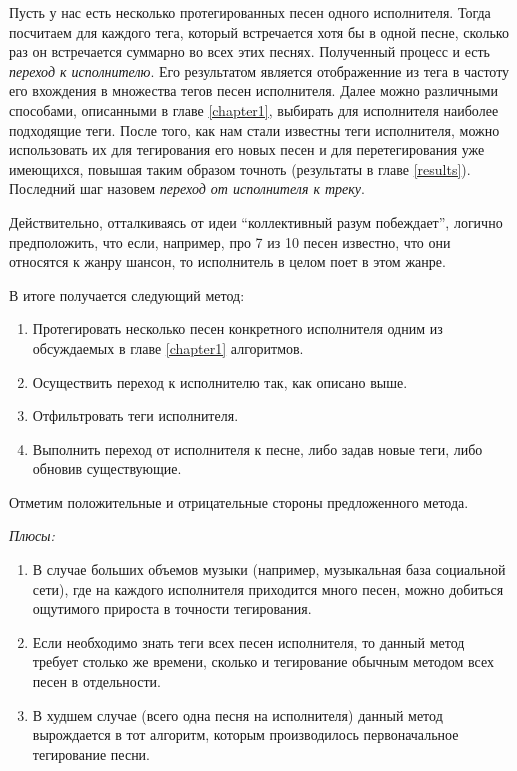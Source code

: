 Пусть у нас есть несколько протегированных песен одного исполнителя. Тогда посчитаем для каждого тега, который встречается хотя бы в одной песне, сколько раз он встречается суммарно во всех этих песнях.
Полученный процесс и есть \emph{переход к исполнителю}. Его результатом является отображенние из тега в частоту его вхождения в множества тегов песен исполнителя. 
Далее можно различными способами, описанными в главе \ref{chapter1}, выбирать для исполнителя наиболее подходящие теги. После того, как нам стали известны теги исполнителя, можно использовать их для 
тегирования его новых песен и для перетегирования уже имеющихся, повышая таким образом точноть (результаты в главе \ref{results}). Последний шаг назовем \emph{переход от исполнителя к треку}.

Действительно, отталкиваясь от идеи ``коллективный разум побеждает'', логично предположить, что если, например, про 7 из 10 песен известно, что они относятся к жанру шансон, то исполнитель в целом 
поет в этом жанре.

В итоге получается следующий метод:
\begin{enumerate}
 \item Протегировать несколько песен конкретного исполнителя одним из обсуждаемых в главе \ref{chapter1} алгоритмов.
 \item Осуществить переход к исполнителю так, как описано выше.
 \item Отфильтровать теги исполнителя.
 \item Выполнить переход от исполнителя к песне, либо задав новые теги, либо обновив существующие.
\end{enumerate}

Отметим положительные и отрицательные стороны предложенного метода.

\emph{Плюсы:} 
\begin{enumerate}
 \item В случае больших объемов музыки (например, музыкальная база социальной сети), где на каждого исполнителя приходится много песен, можно добиться ощутимого прироста в точности тегирования.
 \item Если необходимо знать теги всех песен исполнителя, то данный метод требует столько же времени, сколько и тегирование обычным методом всех песен в отдельности.
 \item В худшем случае (всего одна песня на исполнителя) данный метод вырождается в тот алгоритм, которым производилось первоначальное тегирование песни.
\end{enumerate}

